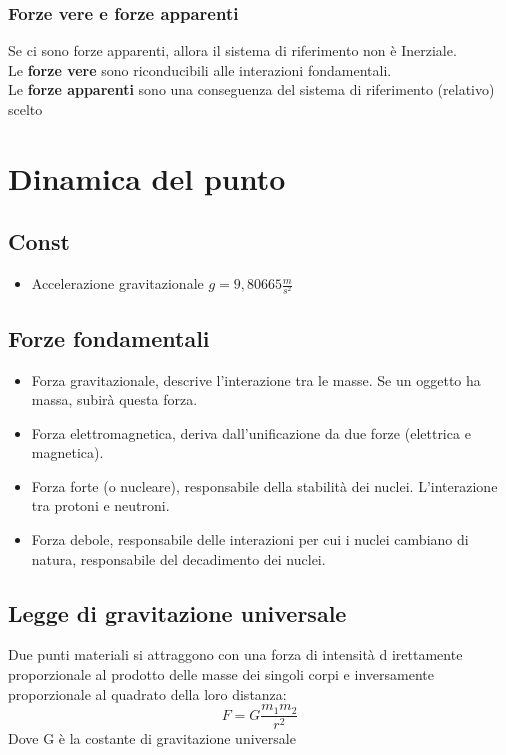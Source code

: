 \documentclass[a4paper]{report}
\begin{document}
  \subsection{Forze vere e forze apparenti}
  Se ci sono forze apparenti, allora il sistema di riferimento non è Inerziale. \\
  Le \textbf{forze vere} sono riconducibili alle interazioni fondamentali.\\
  Le \textbf{forze apparenti} sono una conseguenza del sistema di riferimento (relativo) scelto


  \chapter{Dinamica del punto}

  \section{Const}
  \begin{itemize}
    \item Accelerazione gravitazionale $g = 9,80665 \frac{m}{s^2}$
  \end{itemize}

  \section{Forze fondamentali}
  \begin{itemize}
    \item Forza gravitazionale, descrive l'interazione tra le masse. Se un oggetto ha massa, subirà questa forza.
    \item Forza elettromagnetica, deriva dall'unificazione da due forze (elettrica e magnetica).
    \item Forza forte (o nucleare), responsabile della stabilità dei nuclei. L'interazione tra protoni e neutroni.
    \item Forza debole, responsabile delle interazioni per cui i nuclei cambiano di natura, responsabile del decadimento dei nuclei.
  \end{itemize}


  \section{Legge di gravitazione universale}
  Due punti materiali si attraggono con una forza di intensità d irettamente proporzionale al prodotto delle masse dei singoli corpi e inversamente proporzionale al quadrato della loro distanza:
  $$ F = G \frac{m_1 m_2}{r^2} $$
  Dove G è la costante di gravitazione universale
\end{document}
